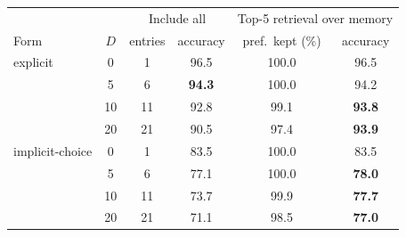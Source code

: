 \begin{tabular}{lc|cc|cc}
\toprule
 & & \multicolumn{2}{c|}{Include all} & \multicolumn{2}{c}{Top-5 retrieval over memory} \\
Form & $D$ & entries & accuracy & pref.\ kept (\%) & accuracy \\
\midrule
explicit & 0 & 1 & 96.5 & 100.0 & 96.5 \\
 & 5 & 6 & \textbf{94.3} & 100.0 & 94.2 \\
 & 10 & 11 & 92.8 & 99.1 & \textbf{93.8} \\
 & 20 & 21 & 90.5 & 97.4 & \textbf{93.9} \\
\midrule
implicit-choice & 0 & 1 & 83.5 & 100.0 & 83.5 \\
 & 5 & 6 & 77.1 & 100.0 & \textbf{78.0} \\
 & 10 & 11 & 73.7 & 99.9 & \textbf{77.7} \\
 & 20 & 21 & 71.1 & 98.5 & \textbf{77.0} \\
\bottomrule
\end{tabular}
